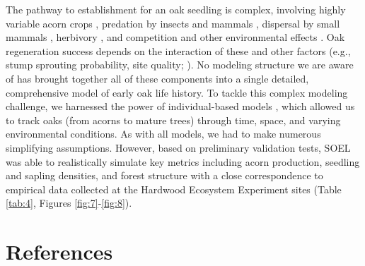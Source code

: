 \documentclass[
11pt, %
a4paper, %
oneside, %
headinclude,footinclude, %
]{scrartcl}
\begin{document}
The pathway to establishment for an oak seedling is complex, involving highly variable acorn crops \citep{Lusk2007, Kellner2014b}, predation by insects and mammals \citep{Bellocq2005, Lombardo2008, Kellner2014b}, dispersal by small mammals \citep{Moore2007,Kellner2016}, herbivory \citep{Kellner2016c}, and competition and other environmental effects \citep{Kellner2016b}. Oak regeneration success depends on the interaction of these and other factors (e.g., stump sprouting probability, site quality; \citealp{Johnson2009}). No modeling structure we are aware of has brought together all of these components into a single detailed, comprehensive model of early oak life history. To tackle this complex modeling challenge, we harnessed the power of individual-based models \citep{Grimm2005}, which allowed us to track oaks (from acorns to mature trees) through time, space, and varying environmental conditions. As with all models, we had to make numerous simplifying assumptions. However, based on preliminary validation tests, SOEL was able to realistically simulate key metrics including acorn production, seedling and sapling densities, and forest structure with a close correspondence to empirical data collected at the Hardwood Ecosystem Experiment sites (Table \ref{tab:4}, Figures \ref{fig:7}-\ref{fig:8}).


\section{References}

\renewcommand{\bibsection}{}


\end{document}
